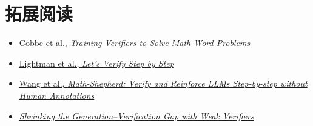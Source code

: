 \section{拓展阅读}

\begin{itemize}
    \item \href{https://arxiv.org/abs/2110.14168}{Cobbe et al., \emph{Training Verifiers to Solve Math Word Problems}}
    \item \href{https://arxiv.org/abs/2305.20050}{Lightman et al., \emph{Let's Verify Step by Step}}
    \item \href{https://arxiv.org/abs/2312.08935}{Wang et al., \emph{Math-Shepherd: Verify and Reinforce LLMs Step-by-step without Human Annotations}}
    \item \href{https://arxiv.org/abs/2506.18203}{\emph{Shrinking the Generation--Verification Gap with Weak Verifiers}}
\end{itemize}


